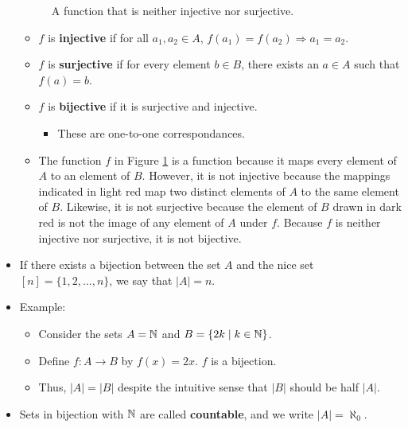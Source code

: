 \documentclass[../main.tex]{subfiles}
\begin{document}
\begin{itemize}
\begin{figure}[h!]
        \caption{A function that is neither injective nor surjective.}
        \label{fig:notInjectSurject}
    \end{figure}
    \begin{itemize}
        \item $f$ is \textbf{injective} if for all $a_1,a_2\in A$, $f(a_1)=f(a_2) \Longrightarrow a_1=a_2$.
        \item $f$ is \textbf{surjective} if for every element $b\in B$, there exists an $a\in A$ such that $f(a)=b$.
        \item $f$ is \textbf{bijective} if it is surjective and injective.
        \begin{itemize}
            \item These are one-to-one correspondances.
        \end{itemize}
        \item The function $f$ in Figure \ref{fig:notInjectSurject} is a function because it maps every element of $A$ to an element of $B$. However, it is not injective because the mappings indicated in \textcolor{rey}{light red} map two distinct elements of $A$ to the same element of $B$. Likewise, it is not surjective because the element of $B$ drawn in \textcolor{rex}{dark red} is not the image of any element of $A$ under $f$. Because $f$ is neither injective nor surjective, it is not bijective.
    \end{itemize}
    \item If there exists a bijection between the set $A$ and the nice set $[n]=\{1,2,\dots,n\}$, we say that $|A|=n$.
    \item Example:
    \begin{itemize}
        \item Consider the sets $A=\mathbb{N}$ and $B=\{2k\mid k\in\mathbb{N}\}$.
        \item Define $f:A\to B$ by $f(x)=2x$. $f$ is a bijection.
        \item Thus, $|A|=|B|$ despite the intuitive sense that $|B|$ should be half $|A|$.
    \end{itemize}
    \item Sets in bijection with $\mathbb{N}$ are called \textbf{countable}, and we write $|A|=\aleph_0$.

\end{itemize}
\end{document}
